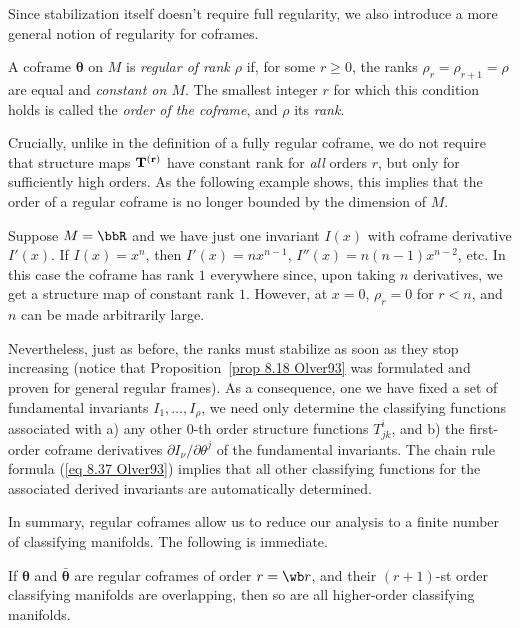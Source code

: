 Since stabilization itself doesn't require full regularity, we also introduce a more general notion of regularity for coframes.

\begin{defn}
    A coframe $\bm\theta$ on $M$ is \emph{regular of rank $\rho$} if, for some $r\geq 0$, the ranks $\rho_r=\rho_{r+1}=\rho$ are equal and \emph{constant on $M$}. The smallest integer $r$ for which this condition holds is called the \emph{order of the coframe}, and $\rho$ its \emph{rank}.
\end{defn}

Crucially, unlike in the definition of a fully regular coframe, we do not require that structure maps $\bf{T}^{(r)}$ have constant rank for \emph{all} orders $r$, but only for sufficiently high orders. As the following example shows, this implies that the order of a regular coframe is no longer bounded by the dimension of $M$.

\begin{example}
    Suppose $M=\bbR$ and we have just one invariant $I(x)$ with coframe derivative $I'(x)$. If $I(x)=x^n$, then $I'(x)=nx^{n-1}$, $I''(x)=n(n-1)x^{n-2}$, etc. In this case the coframe has rank $1$ everywhere since, upon taking $n$ derivatives, we get a structure map of constant rank $1$. However, at $x=0$, $\rho_r=0$ for $r<n$, and $n$ can be made arbitrarily large.
\end{example}

Nevertheless, just as before, the ranks must stabilize as soon as they stop increasing (notice that Proposition~\ref{prop 8.18 Olver93} was formulated and proven for general regular frames). As a consequence, one we have fixed a set of fundamental invariants $I_1,\ldots,I_\rho$, we need only determine the classifying functions associated with a) any other $0$-th order structure functions $T^i_{jk}$, and b) the first-order coframe derivatives $\partial I_\nu/\partial\theta^j$ of the fundamental invariants. The chain rule formula (\ref{eq 8.37 Olver93}) implies that all other classifying functions for the associated derived invariants are automatically determined.

In summary, regular coframes allow us to reduce our analysis to a finite number of classifying manifolds. The following is immediate.

\begin{cor}
    If $\bm\theta$ and $\bar{\bm\theta}$ are regular coframes of order $r=\wb r$, and their $(r+1)$-st order classifying manifolds are overlapping, then so are all higher-order classifying manifolds.
\end{cor}

